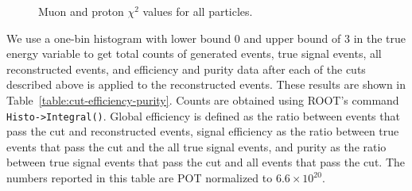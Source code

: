 \documentclass{article}
\begin{document}
\begin{figure}
    \centering
    \caption{Muon and proton $\chi^2$ values for all particles.}
    \label{fig:chi-2-variables}
\end{figure}

We use a one-bin histogram with lower bound $0$ and upper bound of $3$ in the true energy variable to get total counts of generated events, true signal events, all reconstructed events, and efficiency and purity data after each of the cuts described above is applied to the reconstructed events. 
These results are shown in Table~\ref{table:cut-efficiency-purity}. Counts are obtained using ROOT's command \verb|Histo->Integral()|. Global efficiency is defined as the ratio between events that pass the cut and reconstructed events, signal efficiency as the ratio between true events that pass the cut and the all true signal events, and purity as the ratio between true signal events that pass the cut and all events that pass the cut.
The numbers reported in this table are POT normalized to $6.6 \times 10^{20}$.
\end{document}
